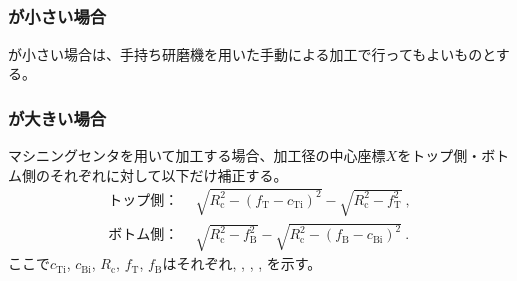 \clearpage
\subsection{\EndFaceInCChamferMilling}

\subsubsection{\EndFaceInCChamferLength が小さい場合}
\EndFaceInCChamferLength が小さい場合は、手持ち研磨機を用いた手動による加工で行ってもよいものとする。

\subsubsection{\EndFaceInCChamferLength が大きい場合}
マシニングセンタを用いて加工する場合、加工径の中心座標$X$をトップ側・ボトム側のそれぞれに対して以下だけ補正する。
\begin{align*}
  \text{トップ側：}&~~
  \sqrt{R_\mathrm c^2-\left(f_\mathrm T-c_\mathrm{Ti}\right)^2}-\sqrt{R_\mathrm c^2-f_\mathrm T^2}\ ,\\
  \text{ボトム側：}&~~
  \sqrt{R_\mathrm c^2-f_\mathrm B^2}-\sqrt{R_\mathrm c^2-\left(f_\mathrm B-c_\mathrm{Bi}\right)^2}\ .
\end{align*}
ここで$c_\mathrm{Ti}$, $c_\mathrm{Bi}$, $R_\mathrm c$, $f_\mathrm T$, $f_\mathrm B$はそれぞれ\TopEndFaceInCChamferLength, \BottomEndFaceInCChamferLength, \CenterCurvatureRadius, \TopAlocationLength, \BottomAlocationLength を示す。



\clearpage


